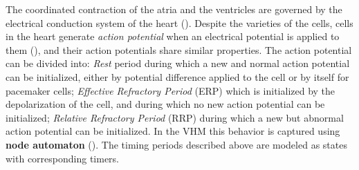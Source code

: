 The coordinated contraction of the atria and the ventricles are governed by the electrical conduction system of the heart (). Despite the varieties of the cells, cells in the heart generate \emph{action potential} when an electrical potential is applied to them (), and their action potentials share similar properties. The action potential can be divided into: \emph{Rest} period during which a new and normal action potential can be initialized, either by potential difference applied to the cell or by itself for pacemaker cells; \emph{Effective Refractory Period} (ERP) which is initialized by the depolarization of the cell, and during which no new action potential can be initialized; \emph{Relative Refractory Period} (RRP) during which a new but abnormal action potential can be initialized. In the VHM this behavior is captured using \textbf{node automaton} (). The timing periods described above are modeled as states with corresponding timers. 

